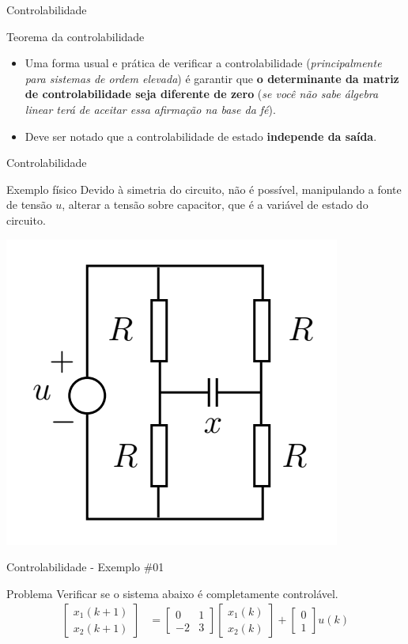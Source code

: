 \begin{frame}{Controlabilidade}
\begin{block}{Teorema da controlabilidade}
\begin{itemize}
    \item Uma forma usual e prática de verificar a controlabilidade (\textit{principalmente para sistemas de ordem elevada}) é garantir que \textbf{o determinante da matriz de controlabilidade seja diferente de zero} (\textit{se você não sabe álgebra linear terá de aceitar essa afirmação na base da fé}).
    \item Deve ser notado que a controlabilidade de estado \textbf{independe da saída}.
\end{itemize}
\end{block}
\end{frame}

\begin{frame}{Controlabilidade}
\begin{block}{Exemplo físico}
	Devido à simetria do circuito, não é possível, manipulando a fonte de tensão  $u$, alterar a tensão sobre capacitor, que é a  variável de estado do circuito. 
\end{block}
\centerline{\includegraphics[width=0.4\linewidth]{Figuras/Ch15/fig0.PNG}}
\end{frame}

\begin{frame}{Controlabilidade - Exemplo \#01}
\begin{block}{Problema}
Verificar se o sistema abaixo é completamente controlável.
\begin{align*}
    \begin{bmatrix} x_1(k+1) \\ x_2(k+1) \end{bmatrix}
    &=
    \begin{bmatrix}
    0 & 1 \\ -2 & 3
    \end{bmatrix}
    \begin{bmatrix}
    x_1(k) \\ x_2(k)
    \end{bmatrix}
    +
    \begin{bmatrix}
    0 \\ 1
    \end{bmatrix}
    u(k)
\end{align*}
\end{block}
\end{frame}

